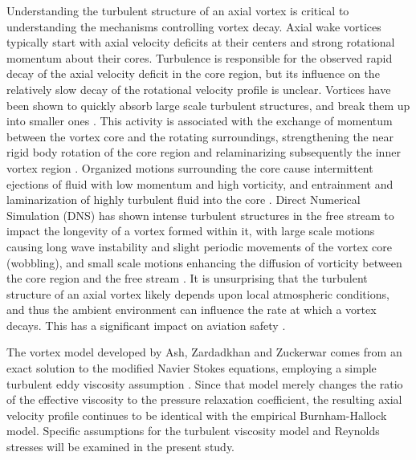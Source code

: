 Understanding the turbulent structure of an axial vortex is critical to 
understanding the mechanisms controlling vortex decay. Axial wake vortices 
typically 
start with axial velocity deficits at their centers and strong rotational 
momentum about their cores. Turbulence is responsible for the observed rapid 
decay of the axial velocity deficit in the core region, but its influence on 
the relatively slow decay of the rotational velocity profile is  unclear. 
Vortices have been shown to quickly absorb large 
scale turbulent structures, and break them up into smaller ones 
\cite{ragab1994,beninati2005}. This activity 
is associated with the exchange of momentum between the vortex core and the 
rotating surroundings, strengthening the near rigid body rotation of the core 
region and relaminarizing subsequently the inner vortex region 
\cite{bandyopadhyay1991}. Organized motions surrounding the core 
cause intermittent ejections of fluid with low momentum and high vorticity, and 
entrainment and laminarization of highly turbulent fluid into the core 
\cite{bandyopadhyay1991}. Direct Numerical Simulation (DNS) has shown 
intense turbulent structures in the free stream to impact the longevity of a 
vortex formed within it, with large scale motions causing long wave instability 
and slight periodic movements of the vortex core (wobbling), and small scale 
motions enhancing the diffusion of vorticity 
between the core region and the free stream \cite{risso1997}. It is 
unsurprising that the turbulent structure of an axial vortex likely depends
upon local atmospheric conditions, and thus the ambient environment can 
influence the rate at which a vortex decays. This has a significant impact on 
aviation safety \cite{ash1998}. 

The vortex model developed by Ash, Zardadkhan 
and Zuckerwar comes from an exact solution to the modified Navier Stokes 
equations, employing a simple turbulent eddy viscosity assumption 
\cite{ash2011}. 
Since that model merely changes the ratio of the effective 
viscosity to the pressure relaxation coefficient, the resulting axial velocity 
profile continues to be identical with the empirical Burnham-Hallock model. 
Specific assumptions for the turbulent viscosity model and Reynolds stresses 
will be examined in the present study.
